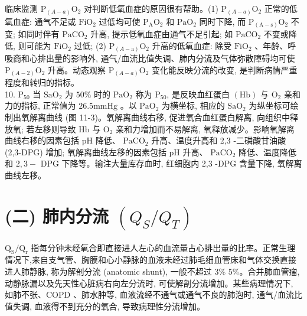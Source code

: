 \documentclass[10pt]{article}
\begin{document}
临床监测 $\mathrm{P}_{(A-a)} \mathrm{O}_{2}$ 对判断低氧血症的原因很有帮助。(1) $\mathrm{P}_{(A-a)} \mathrm{O}_{2}$ 正常的低氧血症: 通气不足或 $\mathrm{FiO}_{2}$ 过低均可使 $\mathrm{P}_{\mathrm{A}} \mathrm{O}_{2}$ 和 $\mathrm{PaO}_{2}$ 同时下降, 而 $\mathrm{P}_{(\mathrm{A}-\mathrm{s})} \mathrm{O}_{2}$ 不变; 如同时伴有 $\mathrm{PaCO}_{2}$ 升高, 提示低氧血症由通气不足引起; 如 $\mathrm{PaCO}_{2}$ 不变或降低, 则可能为 $\mathrm{FiO}_{2}$ 过低; (2) $\mathrm{P}_{(A-\mathrm{a})} \mathrm{O}_{2}$ 升高的低氧血症: 除受 $\mathrm{FiO}_{2}$ 、年龄、呼吸商和心排出量的影响外, 通气/血流比值失调、肺内分流及气体弥散障碍均可使 $\mathrm{P}_{(A-2)} \mathrm{O}_{2}$ 升高。动态观察 $\mathrm{P}_{(A-a)} \mathrm{O}_{2}$ 变化能反映分流的改变, 是判断病情严重程度和转归的指标。\\
10. $\mathrm{P}_{50}$ 当 $\mathrm{SaO}_{2}$ 为 $50 \%$ 时的 $\mathrm{PaO}_{2}$ 称为 $\mathrm{P}_{50}$, 是反映血红蛋白 $(\mathrm{Hb})$ 与 $\mathrm{O}_{2}$ 亲和力的指标, 正常值为 $26.5 \mathrm{mmHg}$ 。以 $\mathrm{PaO}_{2}$ 为横坐标, 相应的 $\mathrm{SaO}_{2}$ 为纵坐标可绘制出氧解离曲线 (图 11-3)。氧解离曲线右移, 促进氧合血红蛋白解离, 向组织中释放氧; 若左移则导致 $\mathrm{Hb}$ 与 $\mathrm{O}_{2}$ 亲和力增加而不易解离, 氧释放减少。影响氧解离曲线右移的因素包括 $\mathrm{pH}$ 降低、 $\mathrm{PaCO}_{2}$ 升高、温度升高和 2,3 -二磷酸甘油酸 (2,3-DPG) 增加; 氧解离曲线左移的因素包括 $\mathrm{pH}$ 升高、 $\mathrm{PaCO}_{2}$ 降低、温度降低和 $2,3-$ DPG 下降等。输注大量库存血时, 红细胞内 2,3 -DPG 含量下降, 氧解离曲线左移。

\section*{(二) 肺内分流 $\left(Q_{S} / Q_{T}\right)$}
$\mathrm{Q}_{\mathrm{S}} / \mathrm{Q}_{\mathrm{r}}$ 指每分钟未经氧合即直接进人左心的血流量占心排出量的比率。正常生理情况下,来自支气管、胸膜和心小静脉的血液未经过肺毛细血管床和气体交换直接进人肺静脉, 称为解剖分流 (anatomic shunt), 一般不超过 3\% 5\%。合并肺血管瘤, 动静脉漏以及先天性心脏病右向左分流时, 可使解剖分流增加。某些病理情况下, 如肺不张、COPD 、肺水肿等, 血液流经不通气或通气不良的肺泡时, 通气/血流比值失调, 血液得不到充分的氧合, 导致病理性分流增加。
\end{document}
